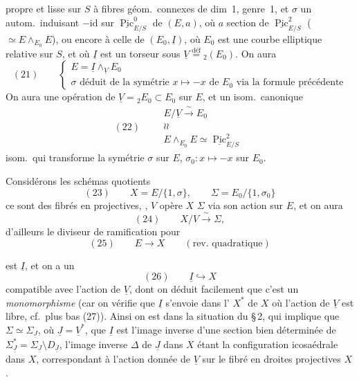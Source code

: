 \documentclass[11pt,a4paper]{article}
\begin{document}
propre et lisse sur $S$ à fibres géom.\ connexes de dim~1, genre~1, et
$\sigma$ un autom.\ induisant $-\mathrm{id}$ sur
$\underline{\operatorname{Pic}}^0_{E/S}$  de
$(E, a)$, où $a$ section de $\underline{\operatorname{Pic}}^2_{E/S}$
($\simeq E \wedge_{E_0} E$), ou encore à celle de $(E_0, \underline{I})$, où
$E_0$ est une courbe elliptique relative sur $S$, et où $\underline{I}$ est un
torseur sous 
$\underline{V} \overset{\text{déf}}{=} {}_2(E_0)$. On aura
\[
  (21) \qquad
  \begin{cases}
    E = \underline{I} \wedge_{\underline{V}} E_0 \\
    \sigma \text{ déduit de la symétrie } x \mapsto -x \text{ de } E_0
    \text{ via la formule précédente}
  \end{cases}
\]
On aura une opération de $\underline{V} = {}_2E_0 \subset E_0$ sur $E$, et un
isom.\ canonique
\[
  (22) \qquad
  \begin{array}{c}
    E/\underline{V} \xrightarrow{\;\sim\;} E_0 \\
    \wr\!\wr \\
    E \wedge_{E_0} E \simeq \underline{\operatorname{Pic}}^2_{E/S}
  \end{array}
\]
isom.\ qui transforme la symétrie $\sigma$ sur $E$, 
$\sigma_0 : x \mapsto -x$ sur $E_0$.

Considérons les schémas quotients
\[
  (23) \qquad X = E/\{1, \sigma\}, \qquad \Sigma = E_0/\{1, \sigma_0\}
\]
ce sont des fibrés en \struck{\ill{}}  projectives,
,  $V$ opère
 $X$  $\Sigma$ via son action sur $E$, et on aura
\[
  (24) \qquad X/V \xrightarrow{\;\sim\;} \Sigma ,
\]
d'ailleurs le diviseur de ramification pour
\[
  (25) \qquad E \to X \qquad (\text{rev.\ quadratique})
\]

est $\underline{I}$, et on a un \struck{\ill{}}
\[
  (26) \qquad \underline{I} \hookrightarrow X
\]
 compatible avec l'action de $\underline{V}$, dont on
déduit facilement que c'est un \emph{monomorphisme} (car on vérifie que
$\underline{I}$ s'envoie dans l'\ill{} $X^*$ de $X$ où l'action de
$\underline{V}$ est libre, cf.\ plus bas (27)). Ainsi on est dans la situation
du §\,2, qui implique que $\Sigma \simeq \Sigma_{\underline{J}}$, où
$\underline{J} = \underline{V}^*$, que $\underline{I}$ est l'image inverse d'une
section bien déterminée \struck{\ill{}} de
$\Sigma^*_{\underline{J}} = \Sigma_{\underline{J}} \setminus D_{\underline{J}}$,
l'image inverse $\Delta$ de $\underline{J}$ dans $X$ étant \struck{\ill{}} la
configuration icosaédrale dans $X$, correspondant à l'action donnée de
$\underline{V}$ sur le \struck{\ill{}} fibré en droites projectives $X$.
\end{document}
